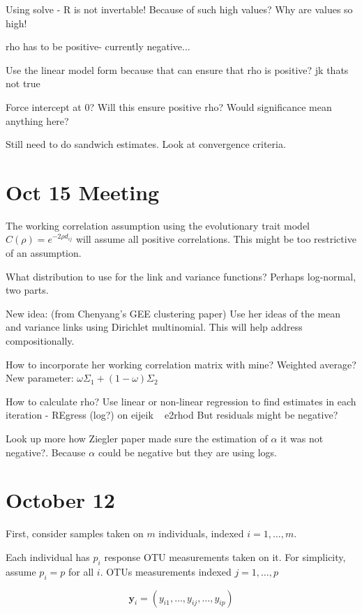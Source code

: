 \documentclass[10pt]{article}
\begin{document}
Using solve - R is not invertable! Because of such high values?
Why are values so high!

rho has to be positive- currently negative...

Use the linear model form because that can ensure that rho is positive? jk thats not true

Force intercept at 0? Will this ensure positive rho?
Would significance mean anything here?


Still need to do sandwich estimates.
Look at convergence criteria.


\section{Oct 15 Meeting}

The working correlation assumption using the evolutionary trait model $C(\rho) = e^{-2\rho d_{ij}}$ will assume all positive correlations. This might be too restrictive of an assumption.

What distribution to use for the link and variance functions? Perhaps log-normal, two parts.

New idea: (from Chenyang's GEE clustering paper) Use her ideas of the mean and variance links using Dirichlet multinomial. This will help address compositionally.

How to incorporate her working correlation matrix with mine? Weighted average? New parameter: $\omega \Sigma_1 + (1 - \omega)\Sigma_2$

How to calculate rho? Use linear or non-linear regression to find estimates in each iteration
- REgress (log?) on eijeik ~ e2rhod
But residuals might be negative?

Look up more how Ziegler paper made sure the estimation of $\alpha$ it was not negative?. Because $\alpha$ could be negative but they are using logs.



\section{October 12}

First, consider samples taken on $m$ individuals, indexed $i = 1, \ldots , m$.


Each individual has $p_i$ response OTU measurements taken on it. For simplicity, assume $p_i = p$ for all $i$. OTUs measurements indexed $j = 1, \ldots , p $

$$\mathbf{y}_i = (y_{i1}, \ldots, y_{ij}, \ldots , y_{ip})$$
\end{document}
